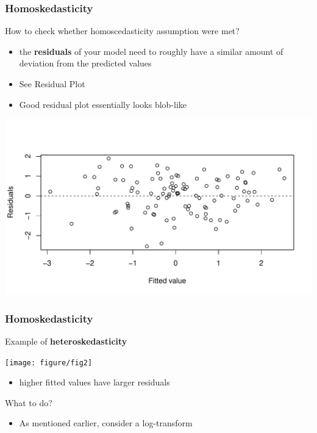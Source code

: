 \documentclass{beamer}\usepackage[]{graphicx}\usepackage[]{color}
\makeatletter
\def\maxwidth{ %
  \ifdim\Gin@nat@width>\linewidth
    \linewidth
  \else
    \Gin@nat@width
  \fi
}
\newenvironment{knitrout}{}{} %
\makeatother
\begin{document}
\begin{frame}
\frametitle{Homoskedasticity}
How to check whether homoscedasticity assumption were met?
\begin{itemize}
\item the \textbf{residuals} of your model need to roughly have a similar amount of deviation from the predicted values
\item See Residual Plot
\item Good residual plot essentially looks blob-like
\end{itemize}
\begin{knitrout}
\color{fgcolor}
\includegraphics[width=\maxwidth]{figure/unnamed-chunk-16-1} 

\end{knitrout}

\end{frame}


\begin{frame}
\frametitle{Homoskedasticity}
Example of \textbf{heteroskedasticity}
\begin{center}
\texttt{[image: figure/fig2]}
\end{center}
\begin{itemize}
\item higher fitted values have larger residuals
\end{itemize}

What to do?
\begin{itemize}
\item As mentioned earlier, consider a \alert{log-transform}
\end{itemize}
\end{frame}
\end{document}
